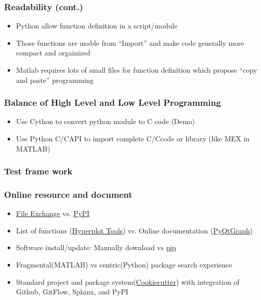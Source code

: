 \documentclass[compress]{beamer}
\newcommand{\CC}{C\nolinebreak\hspace{-.05em}\raisebox{.4ex}{\tiny\bf +}\nolinebreak\hspace{-.10em}\raisebox{.4ex}{\tiny\bf +}}
\begin{document}
\begin{frame}
	\frametitle{Readability (cont.)}
	\begin{itemize}
		\item Python allow function definition in a script/module
		
		\item Those functions are usable from ``Import'' and make code generally more compact and orgainized
		\item Matlab requires lots of small files for function definition which propose ``copy and paste'' programming
	\end{itemize}
\end{frame}

\begin{frame}
	\frametitle{Balance of High Level and Low Level Programming}
	\begin{itemize}
		\item Use Cython to convert python module to C code (Demo) \pause
		\item Use Python C/\CC API to import complete C/\CC code or library (like MEX in MATLAB)
	\end{itemize}
\end{frame}

\begin{frame}
	\frametitle{Test frame work}
	
\end{frame}

\begin{frame}
	\frametitle{Online resource and document}
	\begin{itemize}
		\item \href{http://www.mathworks.com/matlabcentral/fileexchange/?s_tid=gn_mlc_fx}{File Exchange} vs. \href{https://pypi.python.org/pypi}{PyPI}
		\item List of functions (\href{http://www.mathworks.com/matlabcentral/fileexchange/56623-hyperplot-tools}{Hyperplot Tools}) vs. Online documentation (\href{http://www.pyqtgraph.org/}{PyQtGraph})
		\item Software install/update: Manually download vs \href{https://pypi.python.org/pypi/pip}{pip}
		\item Fragmental(MATLAB) vs centric(Python) package search experience
		\item Standard project and package system(\href{https://github.com/audreyr/cookiecutter}{Cookiecutter}) with integration of Github, GitFlow, Sphinx, and PyPI
	\end{itemize}
\end{frame}
\end{document}
